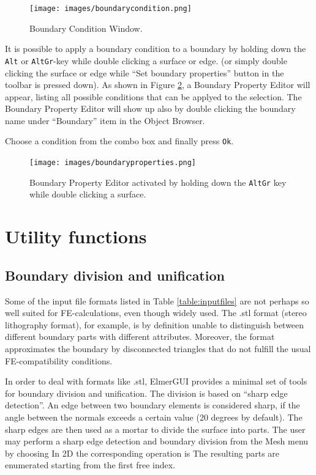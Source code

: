 \begin{figure}[htb]
\begin{center}
 \texttt{[image: images/boundarycondition.png]}
\caption{Boundary Condition Window.}
\label{fig:boundarycondition}
\end{center}
\end{figure}

It is possible to apply a boundary condition to a boundary by holding down 
the \texttt{Alt} or \texttt{AltGr}-key while double clicking a surface or edge. (or simply double clicking the surface or edge while ``Set boundary properties'' button in the toolbar is pressed down).
As shown in Figure \ref{fig:boundarypropertyeditor}, a Boundary Property Editor will appear, listing all possible conditions that can be applyed to the selection. The Boundary Property Editor will show up also by double clicking the boundary name under ``Boundary'' item in the Object Browser. 

Choose a condition from the combo box and finally press \texttt{Ok}.
\begin{figure}[htb]
\begin{center}
 \texttt{[image: images/boundaryproperties.png]}
\caption{Boundary Property Editor activated by holding down the \texttt{AltGr} key while double
clicking a surface.}
\label{fig:boundarypropertyeditor}
\end{center}
\end{figure}

\chapter{Utility functions}

\section{Boundary division and unification}

Some of the input file formats listed in Table \ref{table:inputfiles} are not perhaps so well suited for
FE-calculations, even though widely used. The .stl format (stereo lithography format),
for example, is by definition unable to distinguish between different boundary parts
with different attributes. Moreover, the format approximates the boundary by disconnected
triangles that do not fulfill the usual FE-compatibility conditions.

In order to deal with formats like .stl, ElmerGUI provides a minimal set of tools for
boundary division and unification. The division is based on ``sharp edge detection''.
An edge between two boundary elements is considered sharp, if the angle between the
normals exceeds a certain value (20 degrees by default). The sharp edges are then used
as a mortar to divide the surface into parts. The user may perform a sharp edge detection
and boundary division from the Mesh menu by choosing
\noindent In 2D the corresponding operation is
\noindent The resulting parts are enumerated starting from the first free index.

